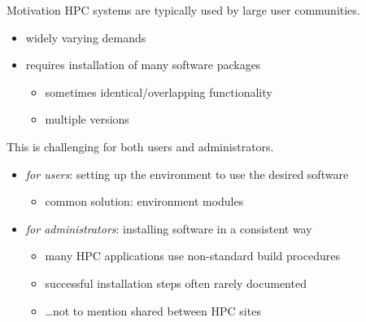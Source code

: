 \documentclass[10pt,xcolor={usenames,dvipsnames}]{beamer}
\begin{document}
\begin{frame}{Motivation}
    HPC systems are typically used by large user communities.
    \begin{itemize}
        \item
            widely varying demands
        \item
            requires installation of many software packages
            \begin{itemize}
                \item
                    sometimes identical/overlapping functionality
                \item
                    multiple versions
            \end{itemize}
    \end{itemize}
    \vspace{1ex}
    This is challenging for both users and administrators.
    \begin{itemize}
        \item
            \emph{for users}: setting up the environment to use the desired software
            \begin{itemize}
                \item
                    common solution: environment modules
            \end{itemize}
        \item
            \emph{for administrators}: installing software in a consistent way
            \begin{itemize}
                \item
                    many HPC applications use non-standard build procedures
                \item
                    successful installation steps often rarely documented
                \item
                    \ldots not to mention shared between HPC sites
            \end{itemize}
    \end{itemize}
\end{frame}

\end{document}

